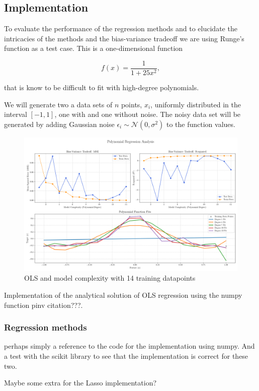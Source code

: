 \documentclass[amssymb,twocolumn,aps]{revtex4}
\begin{document}
\subsection{Implementation}
To evaluate the performance of the regression methods and to elucidate the intricacies of the methods and the bias-variance tradeoff we are using Runge's function as a test case.
This is a one-dimensional function

$$
f(x) = \frac{1}{1 + 25x^2},
$$

that is know to be difficult to fit with high-degree polynomials.

We will generate two a data sets of $n$ points, $x_i$, uniformly distributed in the interval $[-1, 1]$, one with and one without noise.
The noisy data set will be generated by adding Gaussian noise $\epsilon_i \sim \mathcal{N}(0, \sigma^2)$ to the function values.


\begin{figure}[t]
    \centering
    \includegraphics[width=.95 \textwidth]{Figures/Combined_Analysis_OLS.png}
    \caption{OLS and model complexity with 14 training datapoints}
    \label{fig:OLS1}
\end{figure}
Implementation of the analytical solution of OLS regression using the numpy function pinv {citation???}.
\subsubsection{Regression methods}

perhaps simply a reference to the code for the implementation using numpy.
And a test with the scikit library to see that the implementation is correct for these two.

Maybe some extra for the Lasso implementation?
\end{document}
